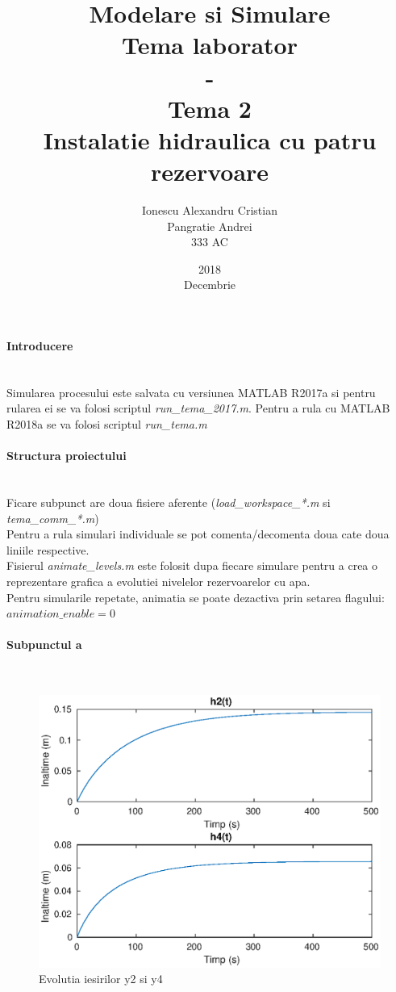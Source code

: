 \documentclass[12pt,english]{article}
\title{Modelare si Simulare\\Tema laborator\\-\\Tema 2\\Instalatie hidraulica cu patru rezervoare}
\date{2018\\Decembrie}
\author{Ionescu Alexandru Cristian\\Pangratie Andrei\\333 AC}
\newcommand{\myparagraph}[1]{\paragraph{#1}\mbox{}\\}
\begin{document}
\maketitle

\pagebreak


\myparagraph {Introducere}
Simularea procesului este salvata cu versiunea MATLAB R2017a si pentru rularea ei se va folosi scriptul \textit{run\_tema\_2017.m}. Pentru a rula cu MATLAB R2018a se va folosi scriptul \textit{run\_tema.m}

\myparagraph {Structura proiectului}
Ficare subpunct are doua fisiere aferente (\textit{load\_workspace\_*.m} si \textit{tema\_comm\_*.m}) \\
Pentru a rula simulari individuale se pot comenta/decomenta doua cate doua liniile respective.\\
Fisierul \textit{animate\_levels.m} este folosit dupa fiecare simulare pentru a crea o reprezentare grafica a evolutiei nivelelor rezervoarelor cu apa.\\
Pentru simularile repetate, animatia se poate dezactiva prin setarea flagului: $animation\_enable = 0$

% 



\myparagraph {Subpunctul a}

\begin{figure} [H]
	\includegraphics[width=1\textwidth]{a_2.eps}
	\caption{Evolutia iesirilor y2 si y4}
\end{figure}
\end{document}
